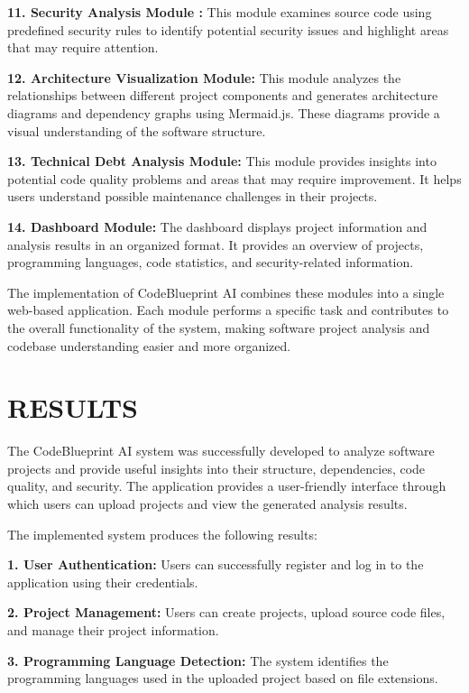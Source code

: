 \documentclass[0pt, a4 paper]{report}
\begin{document}
\begin{center}
{ 
\justify \textbf{11. Security Analysis Module :}  This module examines source code using predefined security rules to identify potential security issues and highlight areas that may require attention.

\justify \textbf{12. Architecture Visualization Module:} This module analyzes the relationships between different project components and generates architecture diagrams and dependency graphs using Mermaid.js. These diagrams provide a visual understanding of the software structure.

\justify \textbf{13. Technical Debt Analysis Module:} This module provides insights into potential code quality problems and areas that may require improvement. It helps users understand possible maintenance challenges in their projects.

\justify \textbf{14. Dashboard Module:} The dashboard displays project information and analysis results in an organized format. It provides an overview of projects, programming languages, code statistics, and security-related information.



\justify The implementation of CodeBlueprint AI combines these modules into a single web-based application. Each module performs a specific task and contributes to the overall functionality of the system, making software project analysis and codebase understanding easier and more organized.



\newpage
\chapter{RESULTS}

\justify The CodeBlueprint AI system was successfully developed to analyze software projects and provide useful insights into their structure, dependencies, code quality, and security. The application provides a user-friendly interface through which users can upload projects and view the generated analysis results.

\justify The implemented system produces the following results:

\justify \textbf{1. User Authentication:} Users can successfully register and log in to the application using their credentials.

\justify \textbf{2. Project Management:} Users can create projects, upload source code files, and manage their project information.

\justify \textbf{3. Programming Language Detection:} The system identifies the programming languages used in the uploaded project based on file extensions.

}
\end{center}
\end{document}

